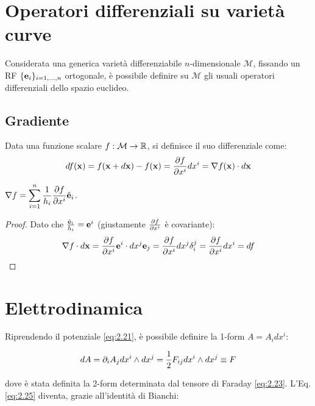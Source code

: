 \section{Operatori differenziali su varietà curve}

Considerata una generica varietà differenziabile $ n $-dimensionale $ \mathcal{M} $, fissando un RF $ \{\mathbf{e}_i\}_{i = 1, \dots, n} $ ortogonale, è possibile definire su $ \mathcal{M} $ gli usuali operatori differenziali dello spazio euclideo.

\subsection{Gradiente}

Data una funzione scalare $ f : \mathcal{M} \rightarrow \mathbb{R} $, si definisce il suo differenziale come:
\begin{equation}
	df(\mathbf{x}) = f(\mathbf{x} + d\mathbf{x}) - f(\mathbf{x}) = \frac{\partial f}{\partial x^i}dx^i = \nabla f(\mathbf{x}) \cdot d\mathbf{x}
	\label{eq:3.21}
\end{equation}

\begin{proposition}
	$ \nabla f = \displaystyle\sum_{i = 1}^{n} \frac{1}{h_i} \frac{\partial f}{\partial x^i} \hat{\mathbf{e}}_i $.
\end{proposition}
\begin{proof}
	Dato che $ \frac{\hat{\mathbf{e}}_i}{h_i} = \mathbf{e}^i $ (giustamente $ \frac{\partial f}{\partial x^i} $ è covariante):
	\begin{equation*}
		\nabla f \cdot d\mathbf{x} = \frac{\partial f}{\partial x^i} \mathbf{e}^i \cdot dx^j \mathbf{e}_j = \frac{\partial f}{\partial x^i} dx^j \delta^j_i = \frac{\partial f}{\partial x^i} dx^i = df
	\end{equation*}
\end{proof}

\section{Elettrodinamica}

Riprendendo il potenziale \ref{eq:2.21}, è possibile definire la 1-form $ A = A_i dx^i $:

\begin{equation}
	dA = \partial_i A_j dx^i \wedge dx^j = \frac{1}{2} F_{ij} dx^i \wedge dx^j \equiv F
	\label{eq:3.13}
\end{equation}

dove è stata definita la 2-form determinata dal tensore di Faraday \ref{eq:2.23}. L'Eq. \ref{eq:2.25} diventa, grazie all'identità di Bianchi:

